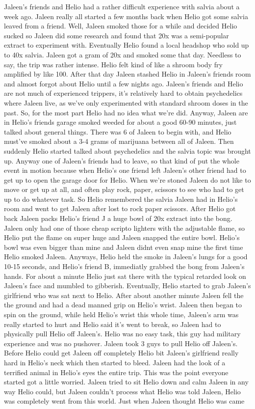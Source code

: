 \documentclass[12pt]{book}
\begin{document}
Jaleen's friends and Helio had a rather difficult experience with salvia about a week ago. Jaleen really all started a few months back when Helio got some salvia leaved from a friend. Well, Jaleen smoked those for a while and decided Helio sucked so Jaleen did some research and found that 20x was a semi-popular extract to experiment with. Eventually Helio found a local headshop who sold up to 40x salvia. Jaleen got a gram of 20x and smoked some that day. Needless to say, the trip was rather intense. Helio felt kind of like a shroom body fry amplified by like 100. After that day Jaleen stashed Helio in Jaleen's friends room and almost forgot about Helio until a few nights ago. Jaleen's friends and Helio are not much of experienced trippers, it's relatively hard to obtain psychedelics where Jaleen live, as we've only experimented with standard shroom doses in the past. So, for the most part Helio had no idea what we're did. Anyway, Jaleen are in Helio's friends garage smoked weeded for about a good 60-90 minutes, just talked about general things. There was 6 of Jaleen to begin with, and Helio must've smoked about a 3-4 grams of marijuana between all of Jaleen. Then suddenly Helio started talked about psychedelics and the salvia topic was brought up. Anyway one of Jaleen's friends had to leave, so that kind of put the whole event in motion because when Helio's one friend left Jaleen's other friend had to get up to open the garage door for Helio. When we're stoned Jaleen do not like to move or get up at all, and often play rock, paper, scissors to see who had to get up to do whatever task. So Helio remembered the salvia Jaleen had in Helio's room and went to get Jaleen after lost to rock paper scissors. After Helio got back Jaleen packs Helio's friend J a huge bowl of 20x extract into the bong. Jaleen only had one of those cheap scripto lighters with the adjustable flame, so Helio put the flame on super huge and Jaleen snapped the entire bowl. Helio's bowl was even bigger than mine and Jaleen didnt even snap mine the first time Helio smoked Jaleen. Anyways, Helio held the smoke in Jaleen's lungs for a good 10-15 seconds, and Helio's friend B, immediatly grabbed the bong from Jaleen's hands. For about a minute Helio just sat there with the typical retarded look on Jaleen's face and mumbled to gibberish. Eventually, Helio started to grab Jaleen's girlfriend who was sat next to Helio. After about another minute Jaleen fell the the ground and had a dead manned grip on Helio's wrist. Jaleen then began to spin on the ground, while held Helio's wrist this whole time, Jaleen's arm was really started to hurt and Helio said it's went to break, so Jaleen had to physically pull Helio off Jaleen's. Helio was no easy task, this guy had military experience and was no pushover. Jaleen took 3 guys to pull Helio off Jaleen's. Before Helio could get Jaleen off completely Helio bit Jaleen's girlfriend really hard in Helio's neck which then started to bleed. Jaleen had the look of a terrified animal in Helio's eyes the entire trip. This was the point everyone started got a little worried. Jaleen tried to sit Helio down and calm Jaleen in any way Helio could, but Jaleen couldn't process what Helio was told Jaleen, Helio was completely went from this world. Just when Jaleen thought Helio was came 
\end{document}
